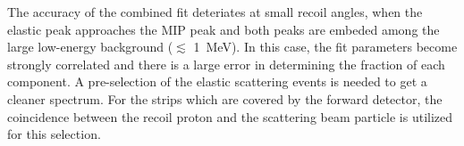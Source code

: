 \documentclass[number,5p]{elsarticle}
\begin{document}
The accuracy of the combined fit deteriates at small recoil angles, when the elastic peak approaches the MIP peak and both peaks are embeded among the large
low-energy background ($\lesssim$ \SI{1}{\MeV}).
In this case, the fit parameters become strongly correlated and there is a large error in determining the fraction of each component.
A pre-selection of the elastic scattering events is needed to get a cleaner spectrum.
For the strips which are covered by the forward detector, the coincidence between the recoil proton and the scattering beam particle is utilized for this selection.

\end{document}
